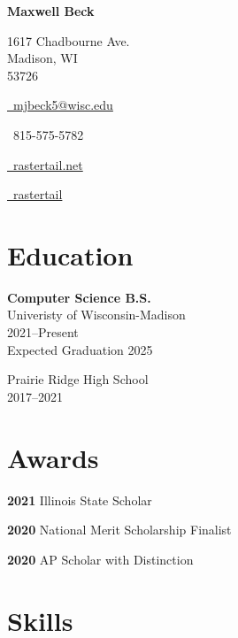 \documentclass[letterpaper,10pt]{article}
\begin{document}
\begin{paracol}{2}

    \begin{center}

        {\LARGE \bfseries Maxwell Beck}

        \medskip

        1617 Chadbourne Ave. \\
        Madison, WI \\
        53726 \\

        \medskip

        \href{mailto:mjbeck5@wisc.edu}{\faEnvelopeO\, mjbeck5@wisc.edu}

        \faPhone\,
        815-575-5782

        \href{https://rastertail.net/}{\faChain\, rastertail.net}

        \href{https://github.com/rastertail}{\faGithub\, rastertail}

    \end{center}

    \section*{Education}

    \textbf{Computer Science B.S.} \\
    Univeristy of Wisconsin-Madison \\
    2021--Present \\
    Expected Graduation 2025

    \medskip

    Prairie Ridge High School \\
    2017--2021

    \section*{Awards}

    \textbf{2021} Illinois State Scholar

    \medskip

    \textbf{2020} National Merit Scholarship Finalist

    \medskip

    \textbf{2020} AP Scholar with Distinction

    \section*{Skills}


\end{paracol}
\end{document}

